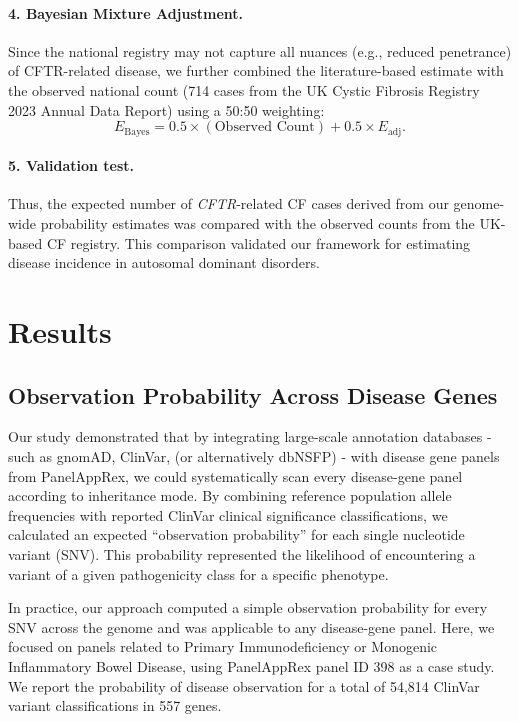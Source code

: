 \paragraph{4. Bayesian Mixture Adjustment.}
Since the national registry may not capture all nuances (e.g., reduced penetrance) of CFTR-related disease, we further combined the literature-based estimate with the observed national count (714 cases from the UK Cystic Fibrosis Registry 2023 Annual Data Report) using a 50:50 weighting:
\[
E_{\text{Bayes}} = 0.5 \times (\text{Observed Count}) + 0.5 \times E_{\text{adj}}.
\]

\paragraph{5. Validation test.}
Thus, the expected number of \textit{CFTR}-related CF cases derived from our genome-wide probability estimates was compared with the observed counts from the UK-based CF registry. This comparison validated our framework for estimating disease incidence in autosomal dominant disorders.

\section{Results}

\subsection{Observation Probability Across Disease Genes}

Our study demonstrated that by integrating large-scale annotation databases -such as gnomAD, ClinVar, (or alternatively dbNSFP) - with disease gene panels from PanelAppRex, we could systematically scan every disease-gene panel according to inheritance mode. By combining reference population allele frequencies with reported ClinVar clinical significance classifications, we calculated an expected ``observation probability'' for each single nucleotide variant (SNV). This probability represented the likelihood of encountering a variant of a given pathogenicity class for a specific phenotype.

In practice, our approach computed a simple observation probability for every SNV across the genome and was applicable to any disease-gene panel. Here, we focused on panels related to Primary Immunodeficiency or Monogenic Inflammatory Bowel Disease, using PanelAppRex panel ID 398 as a case study.
We report the probability of disease observation for a total of 54,814 ClinVar variant classifications in 557 genes.


